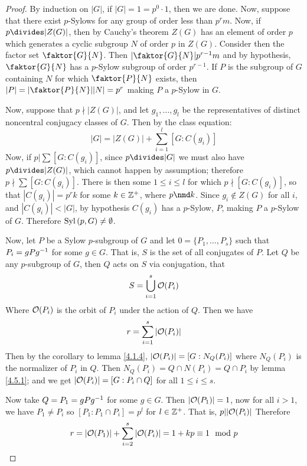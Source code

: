 \begin{proof}
  By induction on $|G|$, if $|G|=1=p^0 \cdot 1$, then we are done.
  Now, suppose that there exist $p$-Sylows for any group of order less than
  $p^rm$. Now, if $p \divides |Z(G)|$, then by Cauchy's theorem $Z(G)$ has an element
  of order $p$ which generates a cyclic subgroup $N$ of order $p$ in $Z(G)$.
  Consider then the factor set $\faktor{G}{N}$. Then $|\faktor{G}{N}|p^{r-1}m$
  and by hypothesis, $\faktor{G}{N}$ has a $p$-Sylow subgroup of order
  $p^{r-1}$. If $P$ is the subgroup of $G$ containing $N$ for which
  $\faktor{P}{N}$ exists, then $|P|=|\faktor{P}{N}||N|=p^r$ making $P$
  a $p$-Sylow in $G$.

  Now, suppose that  $p \nmid |Z(G)|$, and let $g_1, \dots, g_l$ be the
  representatives of distinct noncentral conjugacy classes of $G$. Then by the
  class equation:
  \begin{equation*}
    |G|=|Z(G)|+\sum_{i=1}^l{[G : C(g_i)]}
  \end{equation*}
  Now, if $p|\sum{[G:C(g_i)]}$, since $p \divides |G|$ we must also have
  $p \divides |Z(G)|$, which cannot happen by assumption; therefore $p \nmid
  \sum{[G:C(g_i)]}$. There is then some $1 \leq i \leq l$ for which  $p \nmid
  [G:C(g_i)]$, so that $|C(g_i)|=p^rk$ for some $k \in \mathbb{Z}^+$, where  $p
  \nmd k$. Since  $g_i \notin Z(G)$ for all $i$, and $|C(g_i)|<|G|$,
  by hypothesis $C(g_i)$ has a $p$-Sylow, $P$, making  $P$ a $p$-Sylow of $G$.
  Therefore $\operatorname{Syl}{(p,G)} \neq \emptyset$.

  Now, let $P$ be a Sylow $p$-subgroup of $G$ and let  $0=\{P_1, \dots, P_s\}$
  such that $P_i=gPg^{-1}$ for some $g \in G$. That is,  $S$ is the set of
  all conjugates of  $P$. Let $Q$ be any $p$-subgroup of $G$, then $Q$ acts on
  $S$ via conjugation, that
  \begin{equation*}
    S=\bigcup_{i=1}^s{\mathcal{O}(P_i)}
  \end{equation*}
  Where $\mathcal{O}(P_i)$ is the orbit of $P_i$ under the action of  $Q$. Then we
  have
  \begin{equation*}
    r=\sum_{i=1}^s{|\mathcal{O}(P_i)|}
  \end{equation*}
  Then by the corollary to lemma \ref{4.1.4}, $|\mathcal{O}(P_i)|=[G:N_Q(P_i)]$ where
  $N_Q(P_i)$ is the normalizer of $P_i$ in $Q$. Then $N_Q(P_i)=Q \cap N(P_i)=Q
  \cap P_i$ by lemma \ref{4.5.1}; and we get $|\mathcal{O}(P_i)|=[G:P_i \cap Q]$ for
  all $1 \leq i \leq s$.

  Now take $Q=P_1=gPg^{-1}$ for some $g \in G$. Then  $|\mathcal{O}(P_1)|=1$, now
  for all $i>1$, we have $P_1 \neq P_i$ so $[P_1:P_1 \cap P_i]=p^l$ for $l
  \in \mathbb{Z}^+$. That is,  $p||\mathcal{O}(P_i)|$ Therefore
  \begin{equation*}
    r=|\mathcal{O}(P_1)|+\sum_{i=2}^s{|\mathcal{O}(P_i)|}=1+kp \equiv 1 \mod{p}
  \end{equation*}


\end{proof}
